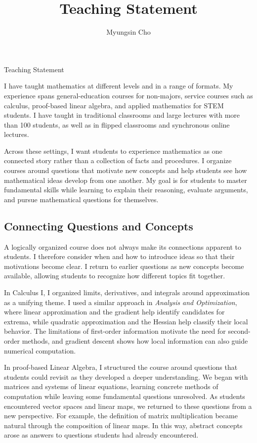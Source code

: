 \documentclass[11pt]{article}
\title{Teaching Statement}
\author{Myungsin Cho}
\date{}
\begin{document}
\begin{center}\LARGE{Teaching Statement}\end{center}

\vspace{2em}

I have taught mathematics at different levels and in a range of formats. My experience spans general-education courses for non-majors, service courses such as calculus, proof-based linear algebra, and applied mathematics for STEM students. I have taught in traditional classrooms and large lectures with more than 100 students, as well as in flipped classrooms and synchronous online lectures.

Across these settings, I want students to experience mathematics as one connected story rather than a collection of facts and procedures. I organize courses around questions that motivate new concepts and help students see how mathematical ideas develop from one another. My goal is for students to master fundamental skills while learning to explain their reasoning, evaluate arguments, and pursue mathematical questions for themselves.

\subsection*{Connecting Questions and Concepts}

A logically organized course does not always make its connections apparent to students. I therefore consider when and how to introduce ideas so that their motivations become clear. I return to earlier questions as new concepts become available, allowing students to recognize how different topics fit together.

In Calculus I, I organized limits, derivatives, and integrals around approximation as a unifying theme. I used a similar approach in \emph{Analysis and Optimization}, where linear approximation and the gradient help identify candidates for extrema, while quadratic approximation and the Hessian help classify their local behavior. The limitations of first-order information motivate the need for second-order methods, and gradient descent shows how local information can also guide numerical computation.

In proof-based Linear Algebra, I structured the course around questions that students could revisit as they developed a deeper understanding. We began with matrices and systems of linear equations, learning concrete methods of computation while leaving some fundamental questions unresolved. As students encountered vector spaces and linear maps, we returned to these questions from a new perspective. For example, the definition of matrix multiplication became natural through the composition of linear maps. In this way, abstract concepts arose as answers to questions students had already encountered.
\end{document}
